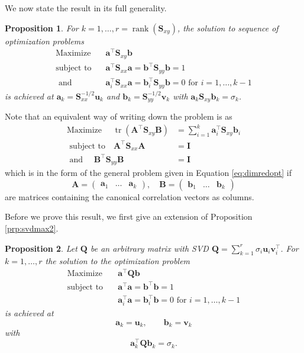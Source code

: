 \documentclass[]{book}
\newtheorem{proposition}{Proposition}[chapter]
\theoremstyle{definition}
\theoremstyle{definition}
\theoremstyle{definition}
\theoremstyle{remark}
\begin{document}
We now state the result in its full generality.

\begin{proposition}
\protect\hypertarget{prp:ccafull}{}{\label{prp:ccafull} }For \(k=1, \ldots, r = \operatorname{rank}(\mathbf S_{xy})\), the solution to sequence of optimization problems
\begin{align}
\mbox{Maximize} \quad &\mathbf a^\top \mathbf S_{xy}\mathbf b\\
\mbox{subject to }  \;\;&\mathbf a^\top \mathbf S_{xx}\mathbf a=\mathbf b^\top\mathbf S_{yy} \mathbf b=1\\
\mbox{ and }\;\;\;&\mathbf a_i^\top \mathbf S_{xx}\mathbf a=\mathbf b_i^\top \mathbf S_{yy}\mathbf b= 0 \mbox{ for }i=1, \ldots, k-1
\end{align}
is achieved at \(\mathbf a_k = \mathbf S_{xx}^{-1/2}\mathbf u_k\) and \(\mathbf b_k=\mathbf S_{yy}^{-1/2}\mathbf v_k\) with \(\mathbf a_k \mathbf S_{xy}\mathbf b_k = \sigma_k\).
\end{proposition}
Note that an equivalent way of writing down the problem is as
\begin{align*}
\mbox{Maximize } \quad \operatorname{tr}(\mathbf A^\top \mathbf S_{xy}\mathbf B) &= \sum_{i=1}^k \mathbf a_i^\top \mathbf S_{xy}\mathbf b_i\\
\mbox{ subject to} \quad \mathbf A^\top \mathbf S_{xx}\mathbf A&=\mathbf I\\
\mbox{ and }\quad \mathbf B^\top \mathbf S_{yy}\mathbf B&= \mathbf I
\end{align*}
which is in the form of the general problem given in Equation \eqref{eq:dimredopt} if \[\mathbf A= \begin{pmatrix}\mathbf a_1&\ldots &\mathbf a_k\end{pmatrix}, \quad \mathbf B= \begin{pmatrix}\mathbf b_1&\ldots &\mathbf b_k\end{pmatrix}\]
are matrices containing the canonical correlation vectors as columns.

Before we prove this result, we first give an extension of Proposition \ref{prp:svdmax2}.

\begin{proposition}
\protect\hypertarget{prp:svdopt3}{}{\label{prp:svdopt3} }Let \(\mathbf Q\) be an arbitrary matrix with SVD \(\mathbf Q= \sum_{k=1}^r \sigma_i \mathbf u_i \mathbf v^\top_i\).
For \(k=1, \ldots, r\) the solution to the optimization problem
\begin{align}
\mbox{Maximize}\quad  &\mathbf a^\top \mathbf Q\mathbf b\\
\mbox{subject to} \quad &\mathbf a^\top \mathbf a= \mathbf b^\top \mathbf b=1\\
&\mathbf a_i^\top\mathbf a= \mathbf b_i^\top\mathbf b= 0 \mbox{ for } i = 1, \ldots, k-1
  \end{align}
is achieved at
\[\mathbf a_k=\mathbf u_k, \qquad \mathbf b_k = \mathbf v_k\]
with
\[\mathbf a_k^\top \mathbf Q\mathbf b_k = \sigma_k.\]
\end{proposition}
\end{document}
